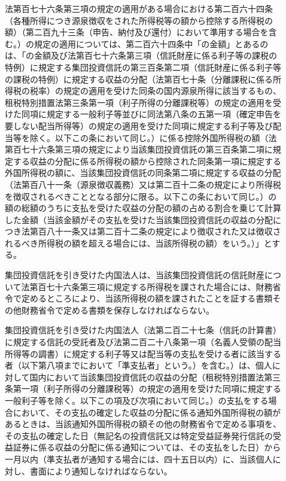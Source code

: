 \documentclass[twocolumn,a4j,10pt]{ltjtarticle}
\begin{document}
\begin{description}
\item[]法第百七十六条第三項の規定の適用がある場合における第二百六十四条（各種所得につき源泉徴収をされた所得税等の額から控除する所得税の額）（第二百九十三条（申告、納付及び還付）において準用する場合を含む。）の規定の適用については、第二百六十四条中「の金額」とあるのは、「の金額及び法第百七十六条第三項（信託財産に係る利子等の課税の特例）に規定する集団投資信託の第三百条第二項（信託財産に係る利子等の課税の特例）に規定する収益の分配（法第百七十条（分離課税に係る所得税の税率）の規定の適用を受けた同条の国内源泉所得に該当するもの、租税特別措置法第三条第一項（利子所得の分離課税等）の規定の適用を受けた同項に規定する一般利子等並びに同法第八条の五第一項（確定申告を要しない配当所得等）の規定の適用を受けた同項に規定する利子等及び配当等を除く。以下この条において同じ。）に係る控除外国所得税の額（法第百七十六条第三項の規定により当該集団投資信託の第三百条第二項に規定する収益の分配に係る所得税の額から控除された同条第一項に規定する外国所得税の額に、当該集団投資信託の同条第二項に規定する収益の分配（法第百八十一条（源泉徴収義務）又は第二百十二条の規定により所得税を徴収されるべきこととなる部分に限る。以下この条において同じ。）の額の総額のうちに支払を受けた収益の分配の額の占める割合を乗じて計算した金額（当該金額がその支払を受けた当該集団投資信託の収益の分配につき法第百八十一条又は第二百十二条の規定により徴収された又は徴収されるべき所得税の額を超える場合には、当該所得税の額）をいう。）」とする。
\item[]集団投資信託を引き受けた内国法人は、当該集団投資信託の信託財産について法第百七十六条第三項に規定する所得税を課された場合には、財務省令で定めるところにより、当該所得税の額を課されたことを証する書類その他財務省令で定める書類を保存しなければならない。
\item[]集団投資信託を引き受けた内国法人（法第二百二十七条（信託の計算書）に規定する信託の受託者及び法第二百二十八条第一項（名義人受領の配当所得等の調書）に規定する利子等又は配当等の支払を受ける者に該当する者（以下第八項までにおいて「準支払者」という。）を含む。）は、個人に対して国内において当該集団投資信託の収益の分配（租税特別措置法第三条第一項（利子所得の分離課税等）の規定の適用を受けた同項に規定する一般利子等を除く。以下この項及び次項において同じ。）の支払をする場合において、その支払の確定した収益の分配に係る通知外国所得税の額があるときは、当該通知外国所得税の額その他の財務省令で定める事項を、その支払の確定した日（無記名の投資信託又は特定受益証券発行信託の受益証券に係る収益の分配に係る通知については、その支払をした日）から一月以内（準支払者が通知する場合には、四十五日以内）に、当該個人に対し、書面により通知しなければならない。

\end{description}
\end{document}
